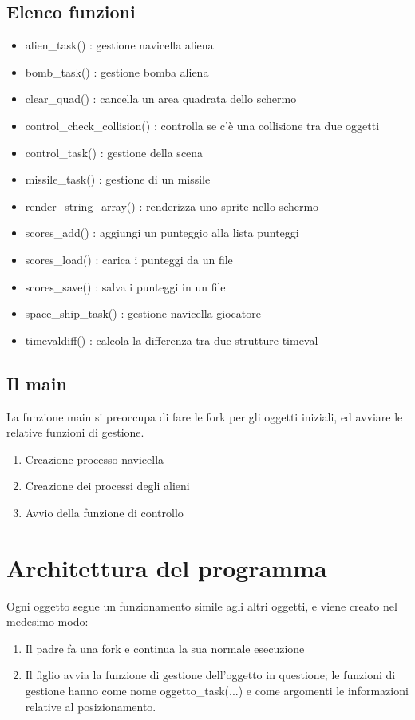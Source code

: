 \documentclass[a4paper,11pt]{report}
\begin{document}
\section{Elenco funzioni}
\begin{itemize}
  \item alien_task() : gestione navicella aliena
  \item bomb_task() : gestione bomba aliena
  \item clear_quad() : cancella un area quadrata dello schermo
  \item control_check_collision() : controlla se c'è una collisione tra due oggetti
  \item control_task() : gestione della scena
  \item missile_task() : gestione di un missile
  \item render_string_array() : renderizza uno sprite nello schermo
  \item scores_add() : aggiungi un punteggio alla lista punteggi
  \item scores_load() : carica i punteggi da un file
  \item scores_save() : salva i punteggi in un file
  \item space_ship_task() : gestione navicella giocatore
  \item timevaldiff() : calcola la differenza tra due strutture timeval
\end{itemize}


\section{Il main}
La funzione main si preoccupa di fare le fork per gli oggetti iniziali, ed avviare 
le relative funzioni di gestione.

\begin{enumerate}
  \item Creazione processo navicella
  \item Creazione dei processi degli alieni
  \item Avvio della funzione di controllo
\end{enumerate}




\chapter{Architettura del programma}

Ogni oggetto segue un funzionamento simile agli altri oggetti, e viene creato nel medesimo modo:
\begin{enumerate}
   \item Il padre fa una fork e continua la sua normale esecuzione
   \item Il figlio avvia la funzione di gestione dell'oggetto in questione; le funzioni di gestione
      hanno come nome oggetto_task(...) e come argomenti le informazioni relative al posizionamento.
 \end{enumerate} 
\end{document}
